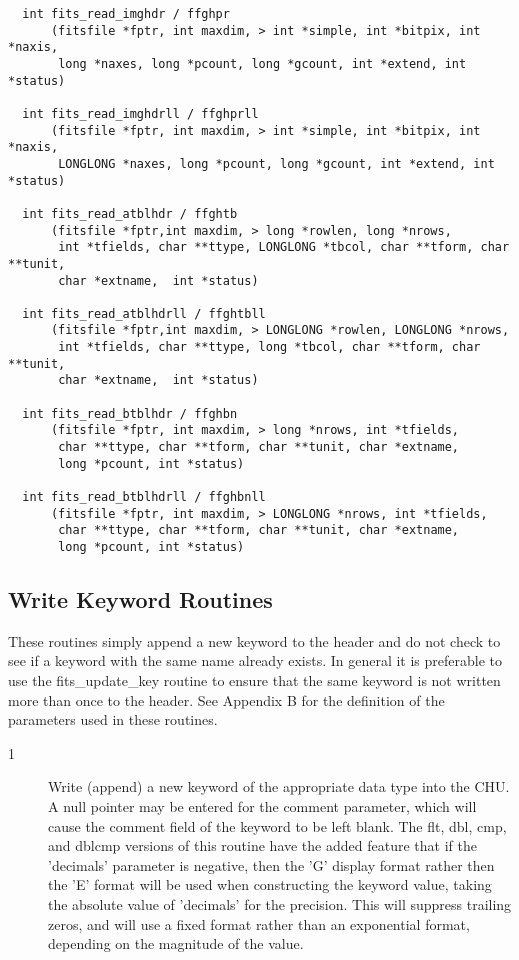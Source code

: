 \documentclass[11pt]{book}
\begin{document}
\begin{verbatim}
  int fits_read_imghdr / ffghpr
      (fitsfile *fptr, int maxdim, > int *simple, int *bitpix, int *naxis,
       long *naxes, long *pcount, long *gcount, int *extend, int *status)

  int fits_read_imghdrll / ffghprll
      (fitsfile *fptr, int maxdim, > int *simple, int *bitpix, int *naxis,
       LONGLONG *naxes, long *pcount, long *gcount, int *extend, int *status)

  int fits_read_atblhdr / ffghtb
      (fitsfile *fptr,int maxdim, > long *rowlen, long *nrows,
       int *tfields, char **ttype, LONGLONG *tbcol, char **tform, char **tunit,
       char *extname,  int *status)

  int fits_read_atblhdrll / ffghtbll
      (fitsfile *fptr,int maxdim, > LONGLONG *rowlen, LONGLONG *nrows,
       int *tfields, char **ttype, long *tbcol, char **tform, char **tunit,
       char *extname,  int *status)

  int fits_read_btblhdr / ffghbn
      (fitsfile *fptr, int maxdim, > long *nrows, int *tfields,
       char **ttype, char **tform, char **tunit, char *extname,
       long *pcount, int *status)

  int fits_read_btblhdrll / ffghbnll
      (fitsfile *fptr, int maxdim, > LONGLONG *nrows, int *tfields,
       char **ttype, char **tform, char **tunit, char *extname,
       long *pcount, int *status)
\end{verbatim}

\subsection{Write Keyword Routines}

These routines simply append a new keyword to the header and do not
check to see if a keyword with the same name already exists.  In
general it is preferable to use the fits\_update\_key routine to ensure
that the same keyword is not written more than once to the header.  See
Appendix B for the definition of the parameters used in these
routines.



\begin{description}
\item[1 ]  Write (append) a new keyword of the appropriate data type into the CHU.
     A null pointer may be entered for the comment parameter, which
     will cause the comment field of the keyword to be left blank.  The
     flt, dbl, cmp, and dblcmp versions of this routine have the added
     feature that if the 'decimals' parameter is negative, then the 'G'
     display format rather then the 'E' format will be used when
     constructing the keyword value, taking the absolute value of
     'decimals' for the precision.  This will suppress trailing zeros,
     and will use a fixed format rather than an exponential format,
    depending on the magnitude of the value. \label{ffpkyx}
\end{description}
\end{document}

